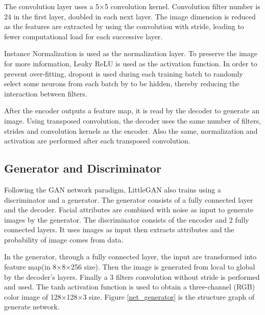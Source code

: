 The convolution layer uses a 5×5 convolution kernel.
Convolution filter number is 24 in the first layer, doubled in each next layer.
The image dimension is reduced as the features are extracted by using the convolution with stride,
    leading to fewer computational load for each successive layer.

Instance Normalization is used as the normalization layer.
To preserve the image for more information, Leaky ReLU is used as the activation function.
In order to prevent over-fitting,
    dropout is used during each training batch to randomly select some neurons from each batch by to be hidden,
    thereby reducing the interaction between filters.

After the encoder outputs a feature map, it is read by the decoder to generate an image.
Using transposed convolution, the decoder uses the same number of filters,
    strides and convolution kernels as the encoder.
Also the same, normalization and activation are performed after each transposed convolution.

\subsection{Generator and Discriminator}

Following the GAN network paradigm, LittleGAN also trains using a discriminator and a generator.
The generator consists of a fully connected layer and the decoder.
Facial attributes are combined with noise as input to generate images by the generator.
The discriminator consists of the encoder and 2 fully connected layers.
It uses images as input then extracts attributes and the probability of image comes from data.


In the generator, through a fully connected layer, the input are transformed into feature map(in 8×8×256 size).
Then the image is generated from local to global by the decoder's layers.
Finally a 3 filters convolution without stride is performed and used.
The tanh activation function is used to obtain a three-channel (RGB) color image of 128×128×3 size.
Figure \ref{net_generator} is the structure graph of generate network.

